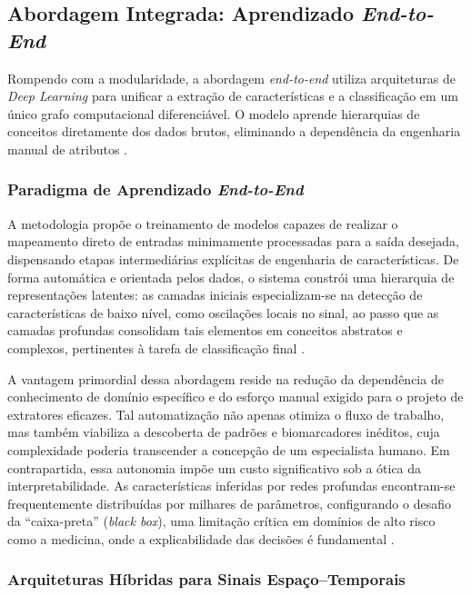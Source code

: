 \documentclass[alpha-refs,brazilian]{CC-EC_TF-TC}
\begin{document}
\subsection{Abordagem Integrada: Aprendizado \textit{End-to-End}}

Rompendo com a modularidade, a abordagem \textit{end-to-end} utiliza arquiteturas de \textit{Deep Learning} para unificar a extração de características e a classificação em um único grafo computacional diferenciável. O modelo aprende hierarquias de conceitos diretamente dos dados brutos, eliminando a dependência da engenharia manual de atributos \citep{Roy2019Deep}.

\subsubsection{Paradigma de Aprendizado \textit{End-to-End}}

A metodologia propõe o treinamento de modelos capazes de realizar o mapeamento direto de entradas minimamente processadas para a saída desejada, dispensando etapas intermediárias explícitas de engenharia de características. De forma automática e orientada pelos dados, o sistema constrói uma hierarquia de representações latentes: as camadas iniciais especializam-se na detecção de características de baixo nível, como oscilações locais no sinal, ao passo que as camadas profundas consolidam tais elementos em conceitos abstratos e complexos, pertinentes à tarefa de classificação final \citep{Goodfellow2016}.

A vantagem primordial dessa abordagem reside na redução da dependência de conhecimento de domínio específico e do esforço manual exigido para o projeto de extratores eficazes. Tal automatização não apenas otimiza o fluxo de trabalho, mas também viabiliza a descoberta de padrões e biomarcadores inéditos, cuja complexidade poderia transcender a concepção de um especialista humano. Em contrapartida, essa autonomia impõe um custo significativo sob a ótica da interpretabilidade. As características inferidas por redes profundas encontram-se frequentemente distribuídas por milhares de parâmetros, configurando o desafio da ``caixa-preta'' (\textit{black box}), uma limitação crítica em domínios de alto risco como a medicina, onde a explicabilidade das decisões é fundamental \citep{Sturm2016Interpretable}.

\subsubsection{Arquiteturas Híbridas para Sinais Espaço--Temporais}
\end{document}
